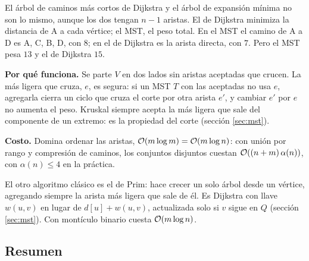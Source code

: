 \documentclass[11pt,letterpaper]{article}
\begin{document}
\begin{ojo}
  El árbol de caminos más cortos de Dijkstra y el árbol de expansión
  mínima no son lo mismo, aunque los dos tengan $n - 1$ aristas. El de
  Dijkstra minimiza la distancia de A a cada vértice; el MST, el peso
  total. En el MST el camino de A a D es A, C, B, D, con $8$; en el de
  Dijkstra es la arista directa, con $7$. Pero el MST pesa $13$ y el de
  Dijkstra $15$.
\end{ojo}

\textbf{Por qué funciona.} Se parte $V$ en dos lados sin aristas
aceptadas que crucen. La más ligera que cruza, $e$, es segura: si un
MST $T$ con las aceptadas no usa $e$, agregarla cierra un ciclo que
cruza el corte por otra arista $e'$, y cambiar $e'$ por $e$ no aumenta
el peso. Kruskal siempre acepta la más ligera que sale del componente
de un extremo: es la propiedad del corte (sección \ref{sec:mst}).

\textbf{Costo.} Domina ordenar las aristas,
$\mathcal{O}\!\left(m \log m\right) = \mathcal{O}\!\left(m \log n\right)$: con unión por rango y compresión
de caminos, los conjuntos disjuntos cuestan
$\mathcal{O}\!\left((n + m)\,\alpha(n)\right)$, con $\alpha(n) \leq 4$ en la práctica.

\begin{observacion}
  El otro algoritmo clásico es el de Prim: hace crecer un solo árbol
  desde un vértice, agregando siempre la arista más ligera que sale de
  él. Es Dijkstra con llave $w(u, v)$ en lugar de $d[u] + w(u, v)$,
  actualizada solo si $v$ sigue en $Q$ (sección \ref{sec:mst}). Con
  montículo binario cuesta $\mathcal{O}\!\left(m \log n\right)$.
\end{observacion}


\subsection*{Resumen}
\end{document}
